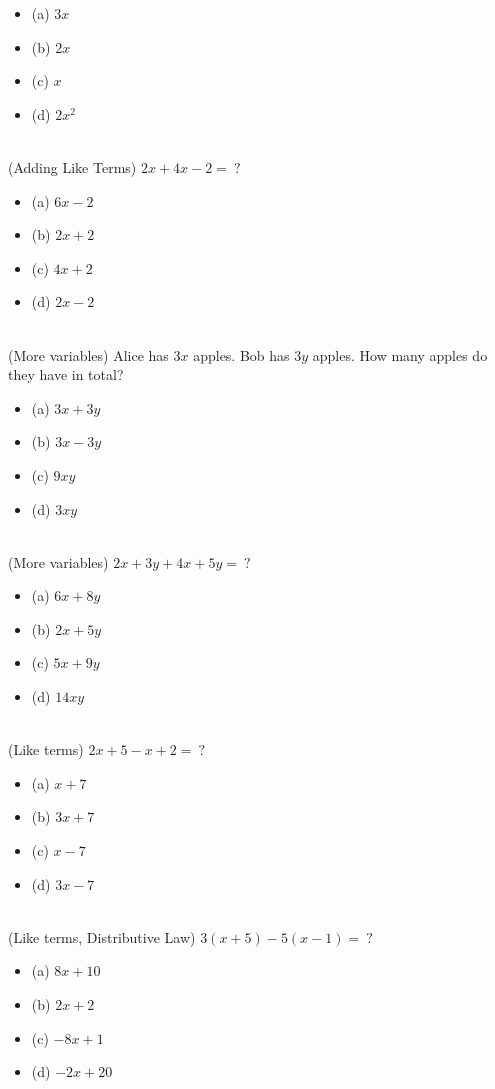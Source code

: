 \documentclass{article}
\begin{document}
\begin{itemize}
    \item[](a) $3x$
    \item[](b) $2x$
    \item[](c) $x$
    \item[](d) $2x^2$
\end{itemize} \hrulefill \\[10pt]
\newpage
\noindent (Adding Like Terms) $2x+4x-2 = \ ?$
\begin{itemize}
    \item[](a) $6x-2$
    \item[](b) $2x+2$
    \item[](c) $4x+2$
    \item[](d) $2x-2$
\end{itemize} \hrulefill \\[10pt]
(More variables) Alice has $3x$ apples. Bob has $3y$ apples. How many apples do they have in total? 
\begin{itemize}
    \item[](a) $3x+3y$
    \item[](b) $3x-3y$
    \item[](c) $9xy$
    \item[](d) $3xy$
\end{itemize} \hrulefill \\[10pt]
(More variables) $2x+3y+4x+5y = \ ?$
\begin{itemize}
    \item[](a) $6x+8y$
    \item[](b) $2x+5y$
    \item[](c) $5x+9y$
    \item[](d) $14xy$
\end{itemize} \hrulefill \\[10pt]
(Like terms) $2x+5-x+2 = \ ?$
\begin{itemize}
\item[] (a) $x+7$
\item[] (b) $3x+7$
\item[] (c) $x-7$
\item[] (d) $3x-7$
\end{itemize} \hrulefill \\[10pt]
\newpage
\noindent (Like terms, Distributive Law) $3(x+5) - 5(x-1) = \ ?$
\begin{itemize}
    \item[] (a) $8x + 10$
    \item[] (b) $2x + 2$
    \item[] (c) $-8x + 1$
    \item[] (d) $-2x+20$
\end{itemize} \hrulefill \\[10pt]
\end{document}
